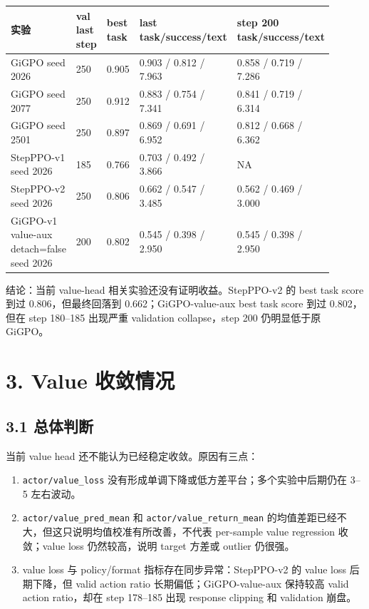 \documentclass[10pt]{ctexart}
\begin{document}
\begin{small}
\begin{longtable}{@{}p{0.18\linewidth}p{0.18\linewidth}p{0.18\linewidth}p{0.18\linewidth}p{0.18\linewidth}@{}}
\toprule
实验 & val last step & best task & last task/success/text & step 200 task/success/text \\
\midrule
GiGPO seed 2026 & 250 & 0.905 & 0.903 / 0.812 / 7.963 & 0.858 / 0.719 / 7.286 \\
GiGPO seed 2077 & 250 & 0.912 & 0.883 / 0.754 / 7.341 & 0.841 / 0.719 / 6.314 \\
GiGPO seed 2501 & 250 & 0.897 & 0.869 / 0.691 / 6.952 & 0.812 / 0.668 / 6.362 \\
StepPPO-v1 seed 2026 & 185 & 0.766 & 0.703 / 0.492 / 3.866 & NA \\
StepPPO-v2 seed 2026 & 250 & 0.806 & 0.662 / 0.547 / 3.485 & 0.562 / 0.469 / 3.000 \\
GiGPO-v1 value-aux detach=false seed 2026 & 200 & 0.802 & 0.545 / 0.398 / 2.950 & 0.545 / 0.398 / 2.950 \\
\bottomrule
\end{longtable}
\end{small}


结论：当前 value-head 相关实验还没有证明收益。StepPPO-v2 的 best task score 到过 0.806，但最终回落到 0.662；GiGPO-value-aux best task score 到过 0.802，但在 step 180--185 出现严重 validation collapse，step 200 仍明显低于原 GiGPO。

\section*{3. Value 收敛情况}

\subsection*{3.1 总体判断}

当前 value head 还不能认为已经稳定收敛。原因有三点：

\begin{enumerate}
\item \texttt{actor/value\_loss} 没有形成单调下降或低方差平台；多个实验中后期仍在 3--5 左右波动。
\item \texttt{actor/value\_pred\_mean} 和 \texttt{actor/value\_return\_mean} 的均值差距已经不大，但这只说明均值校准有所改善，不代表 per-sample value regression 收敛；value loss 仍然较高，说明 target 方差或 outlier 仍很强。
\item value loss 与 policy/format 指标存在同步异常：StepPPO-v2 的 value loss 后期下降，但 valid action ratio 长期偏低；GiGPO-value-aux 保持较高 valid action ratio，却在 step 178--185 出现 response clipping 和 validation 崩盘。
\end{enumerate}
\end{document}
